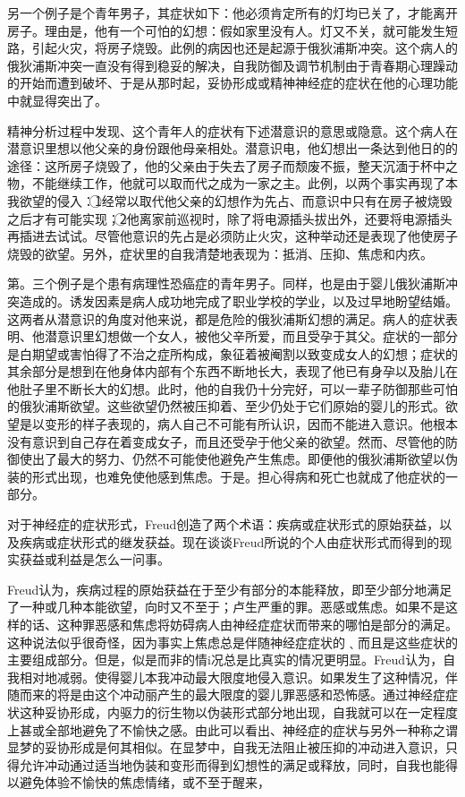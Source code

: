 \documentclass[UTF8,10pt,a4paper,openany]{book}
\begin{document}
另一个例子是个青年男子，其症状如下：他必须肯定所有的灯均已关了，才能离开房子。理由是，他有一个可怕的幻想：假如家里没有人。灯又不关，就可能发生短路，引起火灾，将房子烧毁。此例的病因也还是起源于俄狄浦斯冲突。这个病人的俄狄浦斯冲突一直没有得到稳妥的解决，自我防御及调节机制由于青春期心理躁动的开始而遭到破坏、于是从那时起，妥协形成或精神神经症的症状在他的心理功能中就显得突出了。

精神分析过程中发现、这个青年人的症状有下述潜意识的意思或隐意。这个病人在潜意识里想以他父亲的身份跟他母亲相处。潜意识电，他幻想出一条达到他日的的途径：这所房子烧毁了，他的父亲由于失去了房子而颓废不振，整天沉湎于杯中之物，不能继续工作，他就可以取而代之成为一家之主。此例，以两个事实再现了本我欲望的侵入：\textcircled{1}经常以取代他父亲的幻想作为先占、而意识中只有在房子被烧毁之后才有可能实现；\textcircled{2}他离家前巡视时，除了将电源插头拔出外，还要将电源插头再插进去试试。尽管他意识的先占是必须防止火灾，这种举动还是表现了他使房子烧毁的欲望。另外，症状里的自我清楚地表现为：抵消、压抑、焦虑和内疚。

第。三个例子是个患有病理性恐癌症的青年男子。同样，也是由于婴儿俄狄浦斯冲突造成的。诱发因素是病人成功地完成了职业学校的学业，以及过早地盼望结婚。这两者从潜意识的角度对他来说，都是危险的俄狄浦斯幻想的满足。病人的症状表明、他潜意识里幻想做一个女人，被他父辛所爱，而且受孕于其父。症状的一部分是白期望或害怕得了不治之症所构成，象征着被阉割以致变成女人的幻想；症状的其余部分是想到在他身体内部有个东西不断地长大，表现了他已有身孕以及胎儿在他肚子里不断长大的幻想。此时，他的自我仍十分完好，可以一辈子防御那些可怕的俄狄浦斯欲望。这些欲望仍然被压抑着、至少仍处于它们原始的婴儿的形式。欲望是以变形的样子表现的，病人自己不可能有所认识，因而不能进入意识。他根本没有意识到自己存在着变成女子，而且还受孕于他父亲的欲望。然而、尽管他的防御使出了最大的努力、仍然不可能使他避免产生焦虑。即便他的俄狄浦斯欲望以伪装的形式出现，也难免使他感到焦虑。于是。担心得病和死亡也就成了他症状的一部分。

对于神经症的症状形式，Freud创造了两个术语：疾病或症状形式的原始获益，以及疾病或症状形式的继发获益。现在谈谈Freud所说的个人由症状形式而得到的现实获益或利益是怎么一问事。

Freud认为，疾病过程的原始获益在于至少有部分的本能释放，即至少部分地满足了一种或几种本能欲望，向时又不至于；卢生严重的罪。恶感或焦虑。如果不是这样的话、这种罪恶感和焦虑将妨碍病人由神经症症状而带来的哪怕是部分的满足。这种说法似乎很奇怪，因为事实上焦虑总是伴随神经症症状的﹑而且是这些症状的主要组成部分。但是，似是而非的情i况总是比真实的情况更明显。Freud认为，自我相对地减弱。使得婴儿本我冲动最大限度地侵入意识。如果发生了这种情况，伴随而来的将是由这个冲动丽产生的最大限度的婴儿罪恶感和恐怖感。通过神经症症状这种妥协形成，内驱力的衍生物以伪装形式部分地出现，自我就可以在一定程度上甚或全部地避免了不愉快之感。由此可以看出、神经症的症状与另外一种称之谓显梦的妥协形成是何其相似。在显梦中，自我无法阻止被压抑的冲动进入意识，只得允许冲动通过适当地伪装和变形而得到幻想性的满足或释放，同时，自我也能得以避免体验不愉快的焦虑情绪，或不至于醒来，
\end{document}
